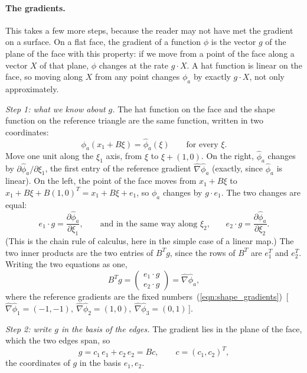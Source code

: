 \paragraph{The gradients.} This takes a few more steps, because the reader may not have met the gradient on a surface. On a flat face, the gradient of a function $\phi$ is the vector $g$ of the plane of the face with this property: if we move from a point of the face along a vector $X$ of that plane, $\phi$ changes at the rate $g \cdot X$. A hat function is linear on the face, so moving along $X$ from any point changes $\phi_a$ by exactly $g \cdot X$, not only approximately.

\emph{Step 1: what we know about $g$.} The hat function on the face and the shape function on the reference triangle are the same function, written in two coordinates:
\begin{equation*}
\phi_a(x_1 + B\xi) = \hat\phi_a(\xi) \qquad \text{for every } \xi .
\end{equation*}
Move one unit along the $\xi_1$ axis, from $\xi$ to $\xi + (1, 0)$. On the right, $\hat\phi_a$ changes by $\partial\hat\phi_a/\partial\xi_1$, the first entry of the reference gradient $\hat\nabla\hat\phi_a$ (exactly, since $\hat\phi_a$ is linear). On the left, the point of the face moves from $x_1 + B\xi$ to $x_1 + B\xi + B(1,0)^T = x_1 + B\xi + e_1$, so $\phi_a$ changes by $g\cdot e_1$. The two changes are equal:
\begin{equation*}
e_1 \cdot g = \frac{\partial\hat\phi_a}{\partial\xi_1}, \qquad\text{and in the same way along $\xi_2$,}\qquad e_2 \cdot g = \frac{\partial\hat\phi_a}{\partial\xi_2} .
\end{equation*}
(This is the chain rule of calculus, here in the simple case of a linear map.) The two inner products are the two entries of $B^T g$, since the rows of $B^T$ are $e_1^T$ and $e_2^T$. Writing the two equations as one,
\begin{equation*}
B^T g = \begin{pmatrix} e_1 \cdot g \\ e_2 \cdot g \end{pmatrix} = \hat\nabla\hat\phi_a ,
\end{equation*}
where the reference gradients are the fixed numbers~(\ref{eqn:shape_gradients})~[\,$\hat\nabla\hat\phi_1 = (-1,-1),\ \hat\nabla\hat\phi_2 = (1,0),\ \hat\nabla\hat\phi_3 = (0,1)$\,].

\emph{Step 2: write $g$ in the basis of the edges.} The gradient lies in the plane of the face, which the two edges span, so
\begin{equation*}
g = c_1\, e_1 + c_2\, e_2 = B c, \qquad c = (c_1, c_2)^T ,
\end{equation*}
the coordinates of $g$ in the basis $e_1, e_2$.


